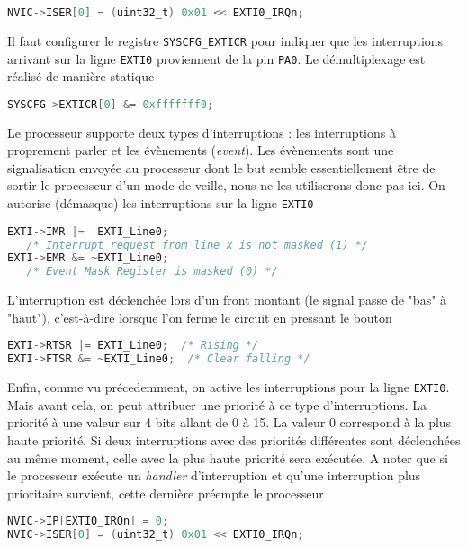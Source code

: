 \documentclass[12pt]{article}
\begin{document}
\begin{lstlisting}[language=C]
NVIC->ISER[0] = (uint32_t) 0x01 << EXTI0_IRQn;
\end{lstlisting}

Il faut configurer le registre \texttt{SYSCFG\_EXTICR} pour indiquer que les interruptions arrivant sur la ligne \texttt{EXTI0} proviennent de la pin \texttt{PA0}. Le démultiplexage est réalisé de manière statique

\begin{lstlisting}[language=C]
SYSCFG->EXTICR[0] &= 0xfffffff0;
\end{lstlisting}

Le processeur supporte deux types d'interruptions : les interruptions à proprement parler et les évènements (\emph{event}). Les évènements sont une signalisation envoyée au processeur dont le but semble essentiellement être de sortir le processeur d'un mode de veille, nous ne les utiliserons donc pas ici. On autorise (démasque) les interruptions sur la ligne \texttt{EXTI0}

\begin{lstlisting}[language=C]
EXTI->IMR |=  EXTI_Line0;
   /* Interrupt request from line x is not masked (1) */
EXTI->EMR &= ~EXTI_Line0;
   /* Event Mask Register is masked (0) */
\end{lstlisting}

L'interruption est déclenchée lors d'un front montant (le signal passe de "bas" à "haut"), c'est-à-dire lorsque l'on ferme le circuit en pressant le bouton 

\begin{lstlisting}[language=C]
EXTI->RTSR |= EXTI_Line0;  /* Rising */
EXTI->FTSR &= ~EXTI_Line0;  /* Clear falling */
\end{lstlisting}

Enfin, comme vu précedemment, on active les interruptions pour la ligne \texttt{EXTI0}. Mais avant cela, on peut attribuer une priorité à ce type d'interruptions. La priorité à une valeur sur 4 bits allant de 0 à 15. La valeur 0 correspond à la plus haute priorité. Si deux interruptions avec des priorités différentes sont déclenchées au même moment, celle avec la plus haute priorité sera exécutée. A noter que si le processeur exécute un \emph{handler} d'interruption et qu'une interruption plus prioritaire survient, cette dernière préempte le processeur

\begin{lstlisting}[language=C]
NVIC->IP[EXTI0_IRQn] = 0;
NVIC->ISER[0] = (uint32_t) 0x01 << EXTI0_IRQn;
\end{lstlisting}
\end{document}
